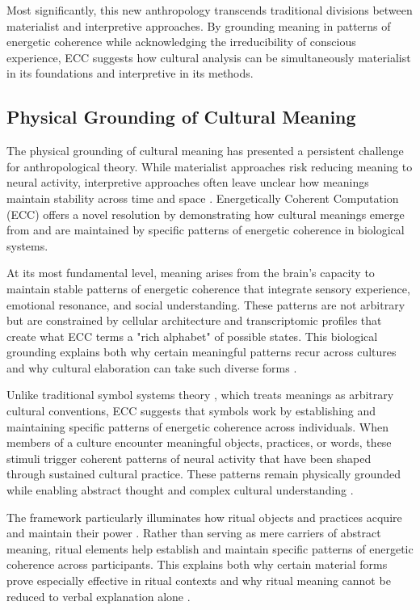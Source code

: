 \begin{refsection}
Most significantly, this new anthropology transcends traditional divisions between materialist and interpretive approaches. By grounding meaning in patterns of energetic coherence while acknowledging the irreducibility of conscious experience, ECC suggests how cultural analysis can be simultaneously materialist in its foundations and interpretive in its methods.

\subsection{Physical Grounding of Cultural Meaning}

The physical grounding of cultural meaning has presented a persistent challenge for anthropological theory. While materialist approaches risk reducing meaning to neural activity, interpretive approaches often leave unclear how meanings maintain stability across time and space \cite{dandrade1995development}. Energetically Coherent Computation (ECC) offers a novel resolution by demonstrating how cultural meanings emerge from and are maintained by specific patterns of energetic coherence in biological systems.

At its most fundamental level, meaning arises from the brain's capacity to maintain stable patterns of energetic coherence that integrate sensory experience, emotional resonance, and social understanding. These patterns are not arbitrary but are constrained by cellular architecture and transcriptomic profiles that create what ECC terms a "rich alphabet" of possible states. This biological grounding explains both why certain meaningful patterns recur across cultures and why cultural elaboration can take such diverse forms \cite{bloch2012anthropology}.

Unlike traditional symbol systems theory \cite{harnad1990symbol}, which treats meanings as arbitrary cultural conventions, ECC suggests that symbols work by establishing and maintaining specific patterns of energetic coherence across individuals. When members of a culture encounter meaningful objects, practices, or words, these stimuli trigger coherent patterns of neural activity that have been shaped through sustained cultural practice. These patterns remain physically grounded while enabling abstract thought and complex cultural understanding \cite{lakoff1999philosophy}.

The framework particularly illuminates how ritual objects and practices acquire and maintain their power \cite{bell1992ritual}. Rather than serving as mere carriers of abstract meaning, ritual elements help establish and maintain specific patterns of energetic coherence across participants. This explains both why certain material forms prove especially effective in ritual contexts and why ritual meaning cannot be reduced to verbal explanation alone \cite{turner1967forest}.


\end{refsection}
